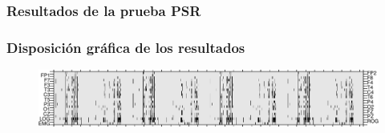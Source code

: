 \documentclass[serif,mathserif,professionalfont]{beamer}
\begin{document}

\begin{frame}[fragile]\frametitle{Resultados de la prueba PSR}
\begin{figure}
\scalebox{0.7}{\usebox{\caja}}
\end{figure}
\end{frame}


\begin{frame}\frametitle{Disposición gráfica de los resultados}
\begin{figure}
\includegraphics[width=\textwidth]{./img_ejemplos/MJNNVIGILOS_est.png}
\end{figure}
\end{frame}

\end{document}
